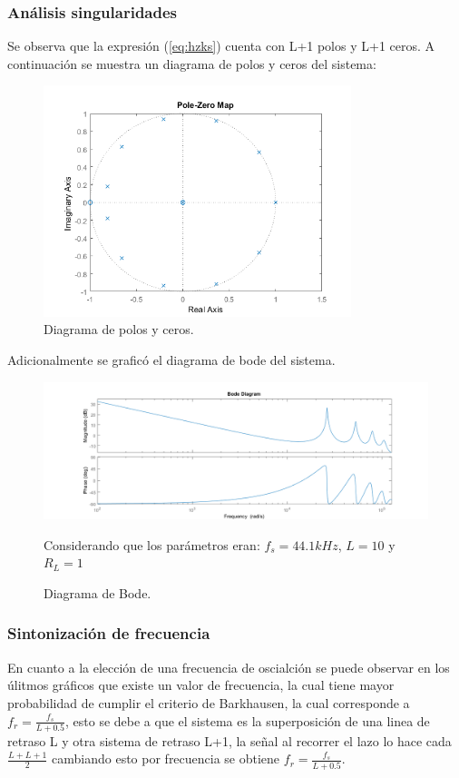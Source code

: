 \subsubsection{Análisis singularidades}
Se observa que la expresión (\ref{eq:hzks}) cuenta con L+1 polos y L+1 ceros. A continuación se muestra un diagrama de polos y ceros del sistema:
\begin{figure}[H]
	\centering
	\includegraphics[width=0.8\textwidth]{ImagenesEjercicio4/pzks.PNG}
\caption{Diagrama de polos y ceros.}
	\label{fig:zpdig}
\end{figure}
Adicionalmente se graficó el diagrama de bode del sistema.
\begin{figure}[H]
	\centering
	\includegraphics[width=\textwidth]{ImagenesEjercicio4/bodeks.PNG}
\caption{Diagrama de Bode.}
Considerando que los parámetros eran: $f_s = 44.1kHz$, $L=10$ y $R_L=1$
	\label{fig:bode}
\end{figure}

\subsubsection{Sintonización de frecuencia}
En cuanto a la elección de una frecuencia de oscialción se puede observar en los úlitmos gráficos que existe un valor de frecuencia, la cual tiene mayor probabilidad de cumplir el criterio de Barkhausen, la cual corresponde a $f_r = \frac{f_s}{L+0.5}$, esto se debe a que el sistema es la superposición de una linea de retraso  L y otra sistema de retraso L+1, la señal al recorrer el lazo lo hace cada $\frac{L+L+1}{2}$ cambiando esto por frecuencia se obtiene $f_r=\frac{f_s}{L+0.5}$.
